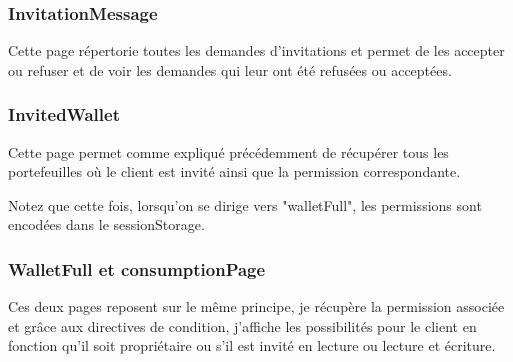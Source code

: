 \subsubsection{InvitationMessage}

\begin{flushleft}
Cette page répertorie toutes les demandes d'invitations et permet de les accepter ou refuser et de voir les demandes qui leur ont été refusées ou acceptées.
\end{flushleft}

\subsubsection{InvitedWallet}

\begin{flushleft}
Cette page permet comme expliqué précédemment de récupérer tous les portefeuilles où le client est invité ainsi que la permission correspondante.
\end{flushleft}
\begin{flushleft}
Notez que cette fois, lorsqu'on se dirige vers "walletFull", les permissions sont encodées dans le sessionStorage.
\end{flushleft}

\subsubsection{WalletFull et consumptionPage}

\begin{flushleft}
Ces deux pages reposent sur le même principe, je récupère la permission associée et grâce aux directives de condition, j'affiche les possibilités pour le client en fonction qu'il soit propriétaire ou s'il est invité en lecture ou lecture et écriture.
\end{flushleft}